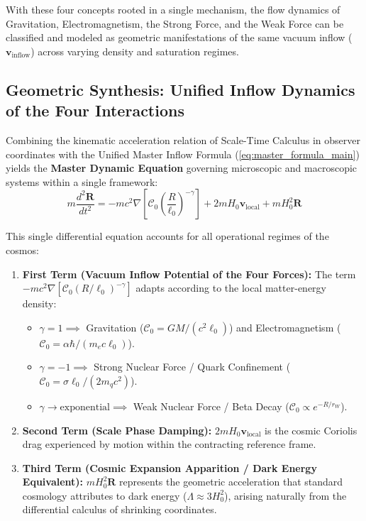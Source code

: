 With these four concepts rooted in a single mechanism, the flow dynamics of Gravitation, Electromagnetism, the Strong Force, and the Weak Force can be classified and modeled as geometric manifestations of the same vacuum inflow ($\mathbf{v}_{\mathrm{inflow}}$) across varying density and saturation regimes.

\subsection{Geometric Synthesis: Unified Inflow Dynamics of the Four Interactions}
\label{sec:ana_dinamik_denklem_main}

Combining the kinematic acceleration relation of Scale-Time Calculus in observer coordinates with the Unified Master Inflow Formula (\ref{eq:master_formula_main}) yields the \textbf{Master Dynamic Equation} governing microscopic and macroscopic systems within a single framework:
\begin{equation}
    \boxed{ m \frac{d^2\mathbf{R}}{dt^2} = - m c^2 \nabla \left[ \mathcal{C}_0 \left(\frac{R}{\ell_0}\right)^{-\gamma} \right] + 2 m H_0 \mathbf{v}_{\mathrm{local}} + m H_0^2 \mathbf{R} }
    \label{eq:master_dynamic_equation}
\end{equation}

This single differential equation accounts for all operational regimes of the cosmos:
\begin{enumerate}
    \item \textbf{First Term (Vacuum Inflow Potential of the Four Forces):} The term $- m c^2 \nabla [\mathcal{C}_0 (R/\ell_0)^{-\gamma}]$ adapts according to the local matter-energy density:
          \begin{itemize}
              \item $\gamma = 1 \implies$ Gravitation ($\mathcal{C}_0 = GM/(c^2 \ell_0)$) and Electromagnetism ($\mathcal{C}_0 = \alpha \hbar / (m_e c \ell_0)$).
              \item $\gamma = -1 \implies$ Strong Nuclear Force / Quark Confinement ($\mathcal{C}_0 = \sigma \ell_0 / (2m_q c^2)$).
              \item $\gamma \to \text{exponential} \implies$ Weak Nuclear Force / Beta Decay ($\mathcal{C}_0 \propto e^{-R/r_W}$).
          \end{itemize}
    \item \textbf{Second Term (Scale Phase Damping):} $2 m H_0 \mathbf{v}_{\mathrm{local}}$ is the cosmic Coriolis drag experienced by motion within the contracting reference frame.
    \item \textbf{Third Term (Cosmic Expansion Apparition / Dark Energy Equivalent):} $m H_0^2 \mathbf{R}$ represents the geometric acceleration that standard cosmology attributes to dark energy ($\Lambda \approx 3 H_0^2$), arising naturally from the differential calculus of shrinking coordinates.
\end{enumerate}

